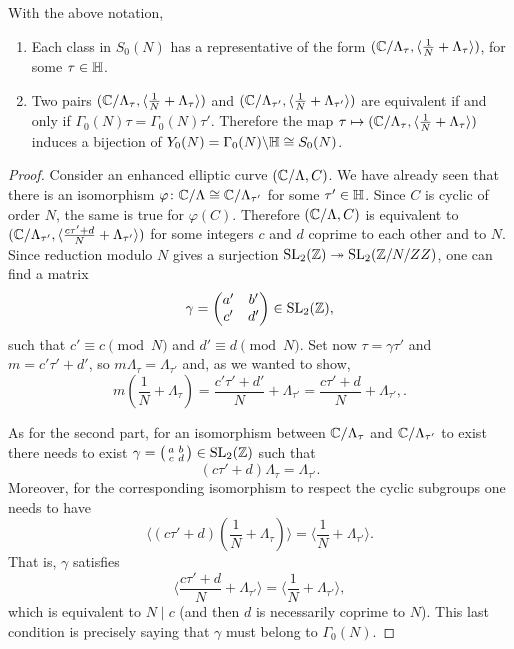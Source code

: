 \begin{theorem}
  With the above notation,
  \begin{enumerate}
  \item Each class in $S_0(N)$ has a representative of the form $(\mathbb{C}/\Lambda_\tau,\langle \frac{1}{N} + \Lambda_\tau\rangle)$, for some $\tau\in\mathbb{H}$.
  \item Two pairs $(\mathbb{C}/\Lambda_\tau,\langle \frac{1}{N}+\Lambda_\tau\rangle)$ and $(\mathbb{C}/\Lambda_{\tau'},\langle \frac{1}{N}+\Lambda_{\tau'}\rangle)$ are equivalent if and only
if $\Gamma_0(N)\tau=\Gamma_0(N)\tau'$. Therefore the map $\tau\mapsto (\mathbb{C}/\Lambda_\tau,\langle \frac 1N+\Lambda_\tau\rangle)$ induces a bijection of $Y_0(N)=\Gamma_0(N)\backslash\mathbb{H}\cong S_0(N)$.
  \end{enumerate}
\end{theorem}

\begin{proof}
  Consider an enhanced elliptic curve $(\mathbb{C}/\Lambda,C)$. We have already seen that there is an isomorphism $\varphi\colon\mathbb{C}/\Lambda\cong \mathbb{C}/\Lambda_{\tau'}$ for some $\tau'\in\mathbb{H}$.
Since $C$ is cyclic of order $N$, the same is true for $\varphi(C)$. Therefore $(\mathbb{C}/\Lambda,C)$ is equivalent to $(\mathbb{C}/\Lambda_{\tau'},\langle\frac{c\tau'+d}{N}+\Lambda_{\tau'}\rangle)$ for some integers $c$ and $d$ coprime to each other
and to $N$. Since reduction modulo $N$ gives a surjection $\operatorname{SL}_2(\mathbb{Z})\twoheadrightarrow \operatorname{SL}_2(\mathbb{Z}/N/ZZ)$, one can find a matrix
\[
\gamma=\left(\begin{matrix}a'&b'\\c'&d'\end{matrix}\right)\in\operatorname{SL}_2(\mathbb{Z}),
\]
such that $c'\equiv c\pmod{N}$ and $d'\equiv d\pmod{N}$. Set now $\tau=\gamma\tau'$ and $m=c'\tau'+d'$, so $m\Lambda_\tau=\Lambda_{\tau'}$ and, as we wanted to show,
\[
m\left(\frac 1N + \Lambda_\tau\right)=\frac{c'\tau'+d'}{N}+\Lambda_{\tau'} = \frac{c\tau'+d}{N}+\Lambda_{\tau'},.
\]


As for the second part, for an isomorphism between $\mathbb{C}/\Lambda_{\tau}$ and $\mathbb{C}/\Lambda_{\tau'}$ to exist there needs to exist $\gamma=\left(\begin{smallmatrix}a&b\\c&d\end{smallmatrix}\right)\in\operatorname{SL}_2(\mathbb{Z})$ such that
\[
(c\tau'+d)\Lambda_\tau = \Lambda_{\tau'}.
\]
Moreover, for the corresponding isomorphism to respect the cyclic subgroups one needs to have
\[
\langle(c\tau'+d)(\frac 1N+\Lambda_\tau)\rangle =\langle \frac 1N+\Lambda_{\tau'}\rangle.
\]
That is, $\gamma$ satisfies
\[
\langle\frac{c\tau'+d}{N}+\Lambda_{\tau'}\rangle = \langle\frac 1N+\Lambda_{\tau'}\rangle,
\]
which is equivalent to $N\mid c$ (and then $d$ is necessarily coprime to $N$). This last condition is precisely saying that $\gamma$ must belong to $\Gamma_0(N)$.
\end{proof}

